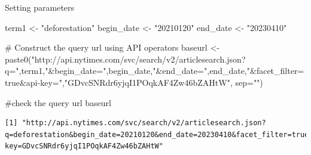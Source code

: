 \documentclass[
  letterpaper,
  DIV=11,
  numbers=noendperiod]{scrartcl}
\newenvironment{Shaded}{\begin{snugshade}}{\end{snugshade}}
\newcommand{\AttributeTok}[1]{\textcolor[rgb]{0.40,0.45,0.13}{#1}}
\newcommand{\CommentTok}[1]{\textcolor[rgb]{0.37,0.37,0.37}{#1}}
\newcommand{\ConstantTok}[1]{\textcolor[rgb]{0.56,0.35,0.01}{#1}}
\newcommand{\ControlFlowTok}[1]{\textcolor[rgb]{0.00,0.23,0.31}{#1}}
\newcommand{\DecValTok}[1]{\textcolor[rgb]{0.68,0.00,0.00}{#1}}
\newcommand{\FunctionTok}[1]{\textcolor[rgb]{0.28,0.35,0.67}{#1}}
\newcommand{\NormalTok}[1]{\textcolor[rgb]{0.00,0.23,0.31}{#1}}
\newcommand{\OtherTok}[1]{\textcolor[rgb]{0.00,0.23,0.31}{#1}}
\newcommand{\SpecialCharTok}[1]{\textcolor[rgb]{0.37,0.37,0.37}{#1}}
\newcommand{\StringTok}[1]{\textcolor[rgb]{0.13,0.47,0.30}{#1}}
\begin{document}
Setting parameters

\begin{Shaded}
\begin{Highlighting}[]
\NormalTok{term1 }\OtherTok{\textless{}{-}} \StringTok{"deforestation"}
\NormalTok{begin\_date }\OtherTok{\textless{}{-}} \StringTok{"20210120"}
\NormalTok{end\_date }\OtherTok{\textless{}{-}} \StringTok{"20230410"}

\CommentTok{\# Construct the query url using API operators}
\NormalTok{baseurl }\OtherTok{\textless{}{-}} \FunctionTok{paste0}\NormalTok{(}\StringTok{"http://api.nytimes.com/svc/search/v2/articlesearch.json?q="}\NormalTok{,term1,}\StringTok{"\&begin\_date="}\NormalTok{,begin\_date,}\StringTok{"\&end\_date="}\NormalTok{,end\_date,}\StringTok{"\&facet\_filter=true\&api{-}key="}\NormalTok{,}\StringTok{"GDvcSNRdr6yjqI1POqkAF4Zw46bZAHtW"}\NormalTok{, }\AttributeTok{sep=}\StringTok{""}\NormalTok{)}

\CommentTok{\#check the query url}
\NormalTok{baseurl}
\end{Highlighting}
\end{Shaded}

\begin{verbatim}
[1] "http://api.nytimes.com/svc/search/v2/articlesearch.json?q=deforestation&begin_date=20210120&end_date=20230410&facet_filter=true&api-key=GDvcSNRdr6yjqI1POqkAF4Zw46bZAHtW"
\end{verbatim}

\begin{Shaded}
\end{Shaded}
\end{document}
